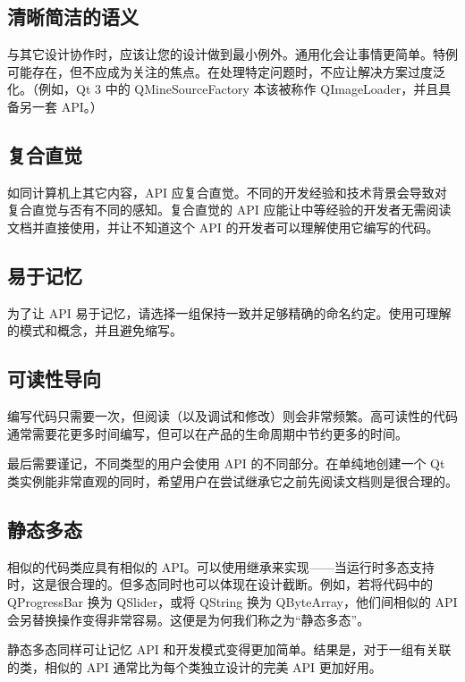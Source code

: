 \subsection{清晰简洁的语义}

与其它设计协作时，应该让您的设计做到最小例外。通用化会让事情更简单。特例可能存在，但不应成为关注的焦点。在处理特定问题时，不应让解决方案过度泛化。（例如，Qt 3 中的 QMineSourceFactory 本该被称作 QImageLoader，并且具备另一套 API。）

\subsection{复合直觉}

如同计算机上其它内容，API 应复合直觉。不同的开发经验和技术背景会导致对复合直觉与否有不同的感知。复合直觉的 API 应能让中等经验的开发者无需阅读文档并直接使用，并让不知道这个 API 的开发者可以理解使用它编写的代码。

\subsection{易于记忆}

为了让 API 易于记忆，请选择一组保持一致并足够精确的命名约定。使用可理解的模式和概念，并且避免缩写。

\subsection{可读性导向}

编写代码只需要一次，但阅读（以及调试和修改）则会非常频繁。高可读性的代码通常需要花更多时间编写，但可以在产品的生命周期中节约更多的时间。

最后需要谨记，不同类型的用户会使用 API 的不同部分。在单纯地创建一个 Qt 类实例能非常直观的同时，希望用户在尝试继承它之前先阅读文档则是很合理的。

\subsection{静态多态}

相似的代码类应具有相似的 API。可以使用继承来实现——当运行时多态支持时，这是很合理的。但多态同时也可以体现在设计截断。例如，若将代码中的 QProgressBar 换为 QSlider，或将 QString 换为 QByteArray，他们间相似的 API 会另替换操作变得非常容易。这便是为何我们称之为“静态多态”。

静态多态同样可让记忆 API 和开发模式变得更加简单。结果是，对于一组有关联的类，相似的 API 通常比为每个类独立设计的完美 API 更加好用。

